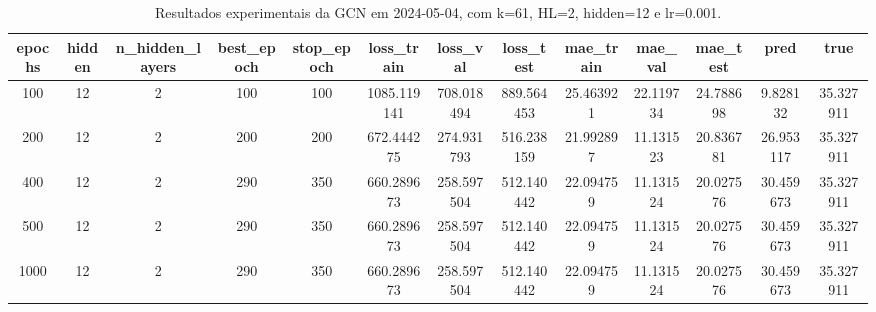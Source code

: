 \begin{table}[h]
\centering
\caption{Resultados experimentais da GCN em 2024-05-04, com k=61, HL=2, hidden=12 e lr=0.001.}
\label{tab:gcn_results_k61_hl2_h12_d20240504}
\begin{tabular}{ccccccccccccc}
\toprule
epochs & hidden & n\_hidden\_layers & best\_epoch & stop\_epoch & loss\_train & loss\_val & loss\_test & mae\_train & mae\_val & mae\_test & pred & true \\
\midrule
100 & 12 & 2 & 100 & 100 & 1085.119141 & 708.018494 & 889.564453 & 25.463921 & 22.119734 & 24.788698 & 9.828132 & 35.327911 \\
200 & 12 & 2 & 200 & 200 & 672.444275 & 274.931793 & 516.238159 & 21.992897 & 11.131523 & 20.836781 & 26.953117 & 35.327911 \\
400 & 12 & 2 & 290 & 350 & 660.289673 & 258.597504 & 512.140442 & 22.094759 & 11.131524 & 20.027576 & 30.459673 & 35.327911 \\
500 & 12 & 2 & 290 & 350 & 660.289673 & 258.597504 & 512.140442 & 22.094759 & 11.131524 & 20.027576 & 30.459673 & 35.327911 \\
1000 & 12 & 2 & 290 & 350 & 660.289673 & 258.597504 & 512.140442 & 22.094759 & 11.131524 & 20.027576 & 30.459673 & 35.327911 \\
\bottomrule
\end{tabular}
\end{table}
